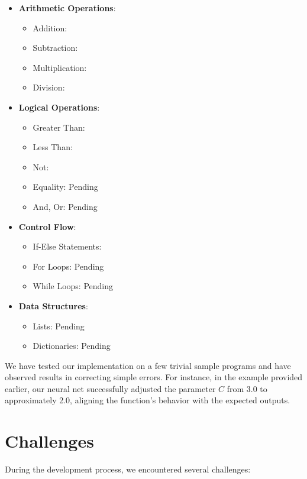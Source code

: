 \documentclass{article}
\begin{document}
\begin{itemize}
    \item \textbf{Arithmetic Operations}:
    \begin{itemize}
        \item Addition: \Checkmark
        \item Subtraction: \Checkmark
        \item Multiplication: \Checkmark
        \item Division: \Checkmark
    \end{itemize}
    \item \textbf{Logical Operations}:
    \begin{itemize}
        \item Greater Than: \Checkmark
        \item Less Than: \Checkmark
        \item Not: \Checkmark
        \item Equality: Pending
        \item And, Or: Pending
    \end{itemize}
    \item \textbf{Control Flow}:
    \begin{itemize}
        \item If-Else Statements: \Checkmark
        \item For Loops: Pending
        \item While Loops: Pending
    \end{itemize}
    \item \textbf{Data Structures}:
    \begin{itemize}
        \item Lists: Pending
        \item Dictionaries: Pending
    \end{itemize}
\end{itemize}

We have tested our implementation on a few trivial sample programs and have observed results in correcting simple errors. For instance, in the example provided earlier, our neural net successfully adjusted the parameter $C$ from 3.0 to approximately 2.0, aligning the function's behavior with the expected outputs.

\section{Challenges}

During the development process, we encountered several challenges:
\end{document}
